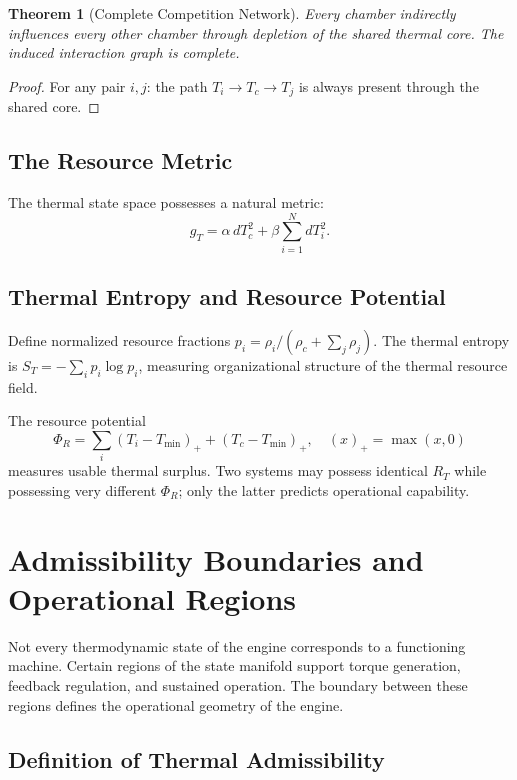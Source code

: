 \documentclass[12pt,a4paper]{article}
\newtheorem{theorem}{Theorem}[section]
\begin{document}
\begin{theorem}[Complete Competition Network]
Every chamber indirectly influences every other chamber through depletion of the shared thermal core. The induced interaction graph is complete.
\end{theorem}

\begin{proof}
For any pair $i, j$: the path $T_i \to T_c \to T_j$ is always present through the shared core.
\end{proof}

\subsection{The Resource Metric}

The thermal state space possesses a natural metric:
\[
g_T = \alpha\, dT_c^2 + \beta \sum_{i=1}^{N} dT_i^2.
\]

\subsection{Thermal Entropy and Resource Potential}

Define normalized resource fractions $p_i = \rho_i / (\rho_c + \sum_j \rho_j)$. The thermal entropy is $S_T = -\sum_i p_i \log p_i$, measuring organizational structure of the thermal resource field.

The resource potential
\[
\Phi_R = \sum_i (T_i - T_{\min})_+ + (T_c - T_{\min})_+, \quad (x)_+ = \max(x, 0)
\]
measures usable thermal surplus. Two systems may possess identical $R_T$ while possessing very different $\Phi_R$; only the latter predicts operational capability.

\section{Admissibility Boundaries and Operational Regions}

Not every thermodynamic state of the engine corresponds to a functioning machine. Certain regions of the state manifold support torque generation, feedback regulation, and sustained operation. The boundary between these regions defines the operational geometry of the engine.

\subsection{Definition of Thermal Admissibility}
\end{document}
